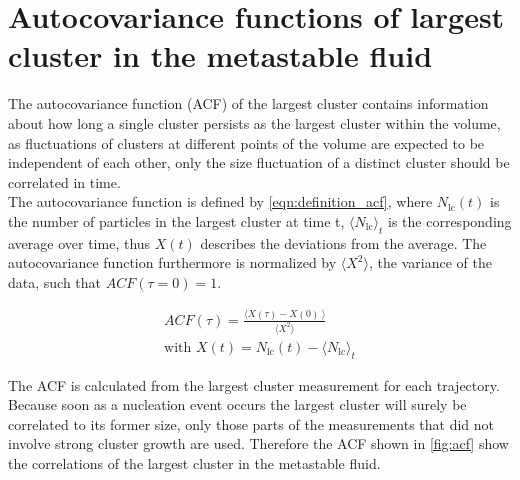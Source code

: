 \section{Autocovariance functions of largest cluster in the metastable fluid}
\label{sec:acf}
The autocovariance function (ACF) of the largest cluster contains information about how long a single cluster persists as the largest cluster within the volume, as fluctuations of clusters at different points of the volume are expected to be independent of each other, only the size fluctuation of a distinct cluster should be correlated in time.\\

The autocovariance function is defined by \autoref{eqn:definition_acf}, where $N_{\text{lc}}(t)$ is the number of particles in the largest cluster at time t, $\langle N_{\text{lc}} \rangle_t$ is the corresponding average over time, thus $X(t)$ describes the deviations from the average. The autocovariance function furthermore is normalized by ${ \langle X^2  \rangle }$, the variance of the data, such that $ACF(\tau=0) = 1 $.

\begin{align}
\label{eqn:definition_acf} 
ACF(\tau)=\frac{ \langle  X(\tau)-X(0) \! \: \rangle } { \langle X^2  \rangle }\\  
\text{with } X(t)=N_{\text{lc}}(t)- \langle N_{\text{lc}} \rangle_t 
\end{align}

The ACF is calculated from the largest cluster measurement for each trajectory. Because soon as a nucleation event occurs the largest cluster will surely be correlated to its former size, only those parts of the measurements that did not involve strong cluster growth are used. Therefore the ACF shown in \autoref{fig:acf} show the correlations of the largest cluster in the metastable fluid.\\

